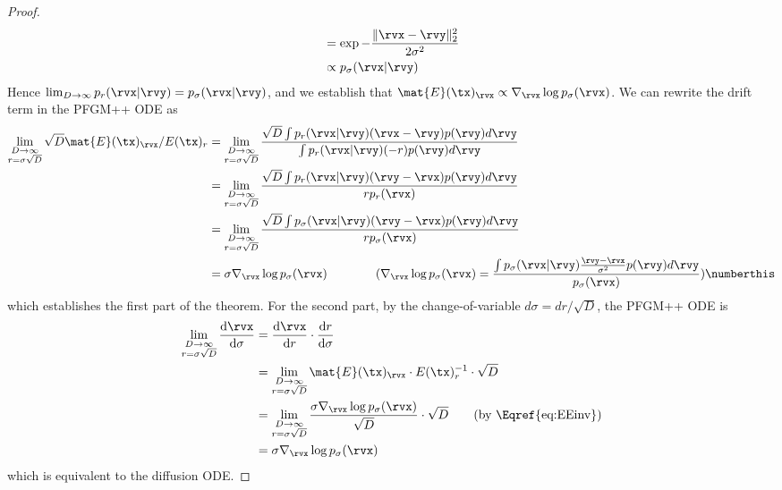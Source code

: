 \begin{proof}
\begin{align*}
   &= \exp-\frac{\|\rvx-\rvy\|_2^2}{ 2\sigma^2}\\
   &\propto  p_\sigma({\rvx}|\rvy) 
\end{align*}    
Hence $\lim_{D\to \infty}p_r({\rvx}|\rvy)=p_\sigma({\rvx}|\rvy)$, and we establish that $\mat{E}(\tx)_{\rvx} \propto \nabla_\rvx \log p_{\sigma}(\rvx)$. We can rewrite the drift term in the PFGM++ ODE as 
\begin{align*}
\lim_{\substack{D\to \infty\\r=\sigma\sqrt{D}}}\sqrt{D}\mat{E}(\tx)_{\rvx} /E(\tx)_{r}&=\lim_{\substack{D\to \infty\\r=\sigma\sqrt{D}}}\frac{\sqrt{D}\int p_r(\rvx|\rvy)(\rvx-\rvy)p(\rvy)d\rvy}{\int p_r(\rvx|\rvy)(-r)p(\rvy)d\rvy}\\
&=\lim_{\substack{D\to \infty\\r=\sigma\sqrt{D}}}\frac{\sqrt{D}\int p_r(\rvx|\rvy)(\rvy-\rvx)p(\rvy)d\rvy}{rp_r(\rvx)}\\
&= \lim_{\substack{D\to \infty\\r=\sigma\sqrt{D}}}\frac{\sqrt{D}\int p_\sigma(\rvx|\rvy)(\rvy-\rvx)p(\rvy)d\rvy}{rp_\sigma(\rvx)}\\
&= {\sigma \nabla_\rvx\log p_{\sigma}(\rvx)}\qquad\qquad \text{($\nabla_\rvx \log p_{\sigma}(\rvx)=\frac{\int p_\sigma(\rvx|\rvy)\frac{\rvy-\rvx}{\sigma^2}p(\rvy)d\rvy}{p_\sigma(\rvx)}$)}\numberthis \label{eq:EEinv}
\end{align*}
which establishes the first part of the theorem. For the second part, by the change-of-variable $d\sigma = dr/\sqrt{D}$, the PFGM++ ODE is 
\begin{align*}
    \lim_{\substack{D\to \infty\\r=\sigma\sqrt{D}}}\frac{\mathrm{d}\rvx}{\mathrm{d}\sigma} &= \frac{\mathrm{d}\rvx}{\mathrm{d}r} \cdot \frac{\mathrm{d}r}{\mathrm{d}\sigma}\\
    &=\lim_{\substack{D\to \infty\\r=\sigma\sqrt{D}}}\mat{E}(\tx)_{\rvx} \cdot E(\tx)_{r}^{-1} \cdot \sqrt{D}\\
    &= \lim_{\substack{D\to \infty\\r=\sigma\sqrt{D}}}\frac{\sigma \nabla_\rvx\log p_{\sigma}(\rvx)}{\sqrt{D}}\cdot \sqrt{D}\qquad \text{(by \Eqref{eq:EEinv})}\\
    &= {\sigma \nabla_\rvx\log p_{\sigma}(\rvx)}
\end{align*}
which is equivalent to the diffusion ODE.
\end{proof}


